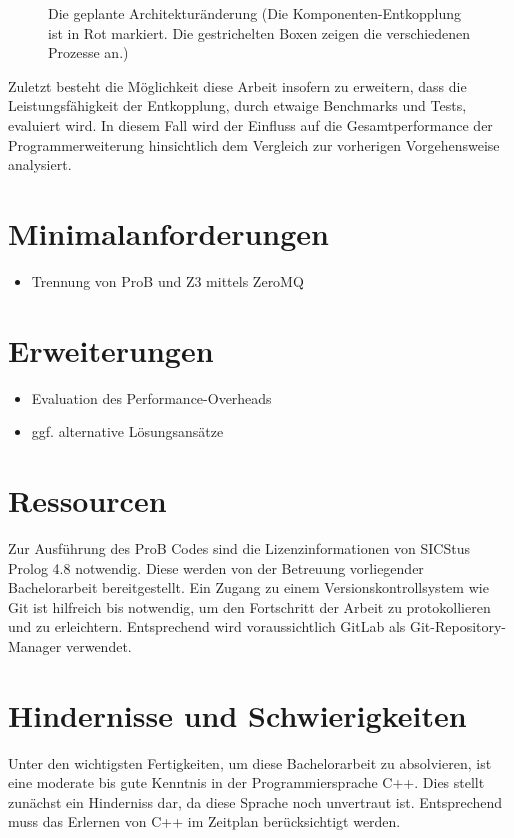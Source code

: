 \documentclass[11pt,a4paper]{scrartcl}
\begin{document}
\begin{figure}[!htp]
    \caption{Die geplante Architekturänderung (Die Komponenten-Entkopplung ist in Rot markiert. Die gestrichelten Boxen zeigen die verschiedenen Prozesse an.)}
\end{figure}
\FloatBarrier

Zuletzt besteht die Möglichkeit diese Arbeit insofern zu erweitern, dass die Leistungsfähigkeit der Entkopplung, durch etwaige Benchmarks und Tests, evaluiert wird.
In diesem Fall wird der Einfluss auf die Gesamtperformance der Programmerweiterung hinsichtlich dem Vergleich zur vorherigen Vorgehensweise analysiert.
\section{Minimalanforderungen}
\begin{itemize}
    \item Trennung von ProB und Z3 mittels ZeroMQ
\end{itemize}

\section{Erweiterungen}
\begin{itemize}
    \item Evaluation des Performance-Overheads
    \item ggf. alternative Lösungsansätze
\end{itemize}

\section{Ressourcen}
Zur Ausführung des ProB Codes sind die Lizenzinformationen von SICStus Prolog 4.8 notwendig.
Diese werden von der Betreuung vorliegender Bachelorarbeit bereitgestellt.
Ein Zugang zu einem Versionskontrollsystem wie Git ist hilfreich bis notwendig, um den Fortschritt der Arbeit zu protokollieren und zu erleichtern.
Entsprechend wird voraussichtlich GitLab als Git-Repository-Manager verwendet.

\section{Hindernisse und Schwierigkeiten}
Unter den wichtigsten Fertigkeiten, um diese Bachelorarbeit zu absolvieren, ist eine moderate bis gute Kenntnis in der Programmiersprache C++.
Dies stellt zunächst ein Hinderniss dar, da diese Sprache noch unvertraut ist. Entsprechend muss das Erlernen von C++ im Zeitplan berücksichtigt werden.
\end{document}
